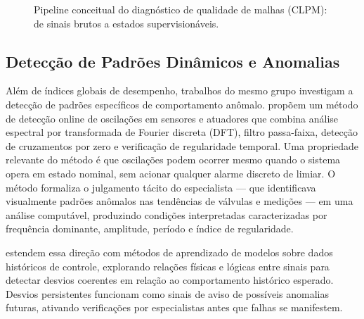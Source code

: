 \begin{figure}[htbp]
	\centering
	\caption{Pipeline conceitual do diagnóstico de qualidade de malhas (CLPM): de sinais brutos a estados supervisionáveis.}
	\label{fig:clpm_pipeline}
\end{figure}

\subsection{Detecção de Padrões Dinâmicos e Anomalias}

Além de índices globais de desempenho, trabalhos do mesmo grupo investigam a detecção de padrões específicos de comportamento anômalo.  propõem um método de detecção online de oscilações em sensores e atuadores que combina análise espectral por transformada de Fourier discreta (DFT), filtro passa-faixa, detecção de cruzamentos por zero e verificação de regularidade temporal. Uma propriedade relevante do método é que oscilações podem ocorrer mesmo quando o sistema opera em estado nominal, sem acionar qualquer alarme discreto de limiar. O método formaliza o julgamento tácito do especialista --- que identificava visualmente padrões anômalos nas tendências de válvulas e medições --- em uma análise computável, produzindo condições interpretadas caracterizadas por frequência dominante, amplitude, período e índice de regularidade.

 estendem essa direção com métodos de aprendizado de modelos sobre dados históricos de controle, explorando relações físicas e lógicas entre sinais para detectar desvios coerentes em relação ao comportamento histórico esperado. Desvios persistentes funcionam como sinais de aviso de possíveis anomalias futuras, ativando verificações por especialistas antes que falhas se manifestem.


